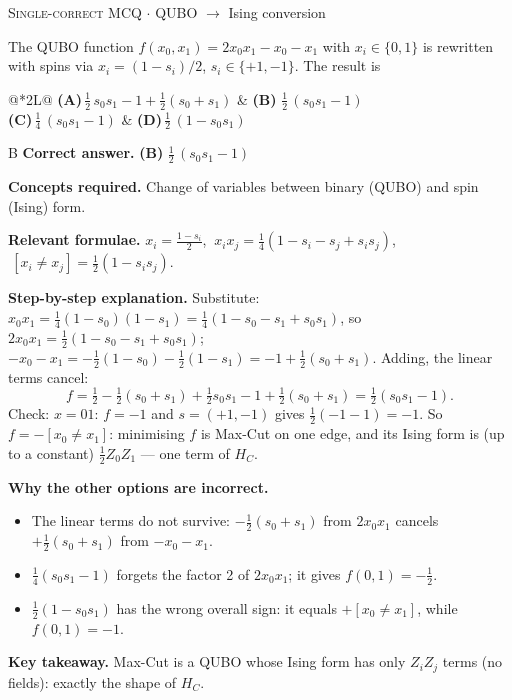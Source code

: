 \documentclass[11pt,a4paper]{article}
\newcommand{\optlabel}[1]{\textbf{(#1)}}
\newcommand{\correctlabel}[1]{\textcolor{okgreen}{\textbf{(#1)}\,\ding{51}}}
\newenvironment{qitem}[1]{\begin{list}{}{\setlength{\leftmargin}{3.3em}\setlength{\labelwidth}{3.1em}%
  \setlength{\labelsep}{0.2em}\setlength{\topsep}{3pt}\setlength{\parsep}{3pt}}\item[\textbf{Q.#1}\hfill]}{\end{list}}
\newcommand{\qsep}{\par\vspace{2pt}{\color{black!15}\hrule}\vspace{4pt}}
\newcommand{\qmeta}[2]{{\footnotesize\color{black!60}\textsc{#1} \;$\cdot$\; #2}\par}
\begin{document}
\begin{qitem}{15}
\qmeta{Single-correct MCQ}{QUBO $\to$ Ising conversion}
The QUBO function $f(x_0, x_1) = 2x_0x_1 - x_0 - x_1$ with $x_i \in \{0,1\}$ is rewritten with spins via
$x_i = (1 - s_i)/2$, $s_i \in \{+1, -1\}$. The result is
\par\smallskip\noindent\begin{tabularx}{\linewidth}{@{}*{2}{L}@{}}
\optlabel{A}\,$\tfrac12\,s_0s_1 - 1 + \tfrac12(s_0 + s_1)$ & \correctlabel{B}\,$\tfrac12\,(s_0s_1 - 1)$ \\[3pt]
\optlabel{C}\,$\tfrac14\,(s_0s_1 - 1)$ & \optlabel{D}\,$\tfrac12\,(1 - s_0s_1)$
\end{tabularx}
\end{qitem}
\begin{solbox}{B}
\textbf{\color{brand}Correct answer.} \textcolor{okgreen}{\textbf{(B)}} $\tfrac12\,(s_0s_1 - 1)$

\textbf{\color{brand}Concepts required.} Change of variables between binary (QUBO) and spin (Ising) form.

\textbf{\color{brand}Relevant formulae.} $x_i = \tfrac{1 - s_i}{2}$, $\ x_ix_j = \tfrac14(1 - s_i - s_j + s_is_j)$, $\ [x_i\neq x_j] = \tfrac12(1 - s_is_j)$.

\textbf{\color{brand}Step-by-step explanation.} Substitute:
$x_0x_1 = \tfrac14(1 - s_0)(1 - s_1) = \tfrac14(1 - s_0 - s_1 + s_0s_1)$, so $2x_0x_1 = \tfrac12(1 - s_0 - s_1 + s_0s_1)$;
$-x_0 - x_1 = -\tfrac12(1 - s_0) - \tfrac12(1 - s_1) = -1 + \tfrac12(s_0 + s_1)$.
Adding, the linear terms cancel:
\[ f = \tfrac12 - \tfrac12(s_0+s_1) + \tfrac12 s_0s_1 - 1 + \tfrac12(s_0+s_1) = \tfrac12(s_0s_1 - 1). \]
Check: $x = 01$: $f = -1$ and $s = (+1, -1)$ gives $\tfrac12(-1-1) = -1$. So $f = -[x_0 \neq x_1]$: minimising $f$ is Max-Cut
on one edge, and its Ising form is (up to a constant) $\tfrac12 Z_0Z_1$ --- one term of $H_C$.

\textbf{\color{brand}Why the other options are incorrect.}
\begin{itemize}[leftmargin=2.4em, itemsep=1pt, topsep=2pt]
\item[\textbf{(A)}] The linear terms do not survive: $-\frac12(s_0+s_1)$ from $2x_0x_1$ cancels $+\frac12(s_0+s_1)$ from $-x_0 - x_1$.
\item[\textbf{(C)}] $\frac14(s_0s_1 - 1)$ forgets the factor 2 of $2x_0x_1$; it gives $f(0,1) = -\frac12$.
\item[\textbf{(D)}] $\frac12(1 - s_0s_1)$ has the wrong overall sign: it equals $+[x_0\neq x_1]$, while $f(0,1) = -1$.
\end{itemize}
\textbf{\color{brand}Key takeaway.} Max-Cut is a QUBO whose Ising form has only $Z_iZ_j$ terms (no fields): exactly the shape of $H_C$.
\end{solbox}
\qsep
\end{document}
